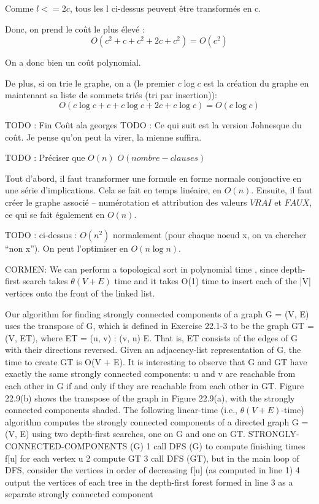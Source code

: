 \documentclass{article}
\begin{document}
Comme $l <= 2c$, tous les l ci-dessus peuvent être transformés en c.

Donc, on prend le coût le plus élevé :
$$
O(c^2 + c + c^2 + 2c + c^2) = O(c^2)
$$

On a donc bien un coût polynomial.

De plus, si on trie le graphe, on a (le premier $c \log c$ est la création du graphe en maintenant sa liste de sommets triés (tri par insertion)):
$$
O(c \log c + c + c \log c + 2c + c \log c) = O(c \log c)
$$

TODO : Fin Coût ala georges
TODO : Ce qui suit est la version Johnesque du coût. Je pense qu'on peut la virer, la mienne suffira.


TODO : Préciser que $O(n)$ $O(nombre-clauses)$

Tout d'abord, il faut transformer une formule en forme normale conjonctive en une série d'implications. Cela se fait en temps linéaire, en $O(n)$. Ensuite, il faut créer le graphe associé -- numérotation et attribution des valeurs $VRAI$ et $FAUX$, ce qui se fait également en $O(n)$.

TODO : ci-dessus : $O(n^2)$ normalement (pour chaque noeud x, on va chercher ``non x''). On peut l'optimiser en $O(n \log n)$.

CORMEN:
We can perform a topological sort in polynomial time , since depth-first search takes $\theta(V + E)$
time and it takes O(1) time to insert each of the |V| vertices onto the front of the linked list.


Our algorithm for finding strongly connected components of a graph G = (V, E) uses the
transpose of G, which is defined in Exercise 22.1-3 to be the graph GT = (V, ET), where ET =
{(u, v) : (v, u) E}. That is, ET consists of the edges of G with their directions reversed. Given
an adjacency-list representation of G, the time to create GT is O(V + E). It is interesting to
observe that G and GT have exactly the same strongly connected components: u and v are
reachable from each other in G if and only if they are reachable from each other in GT. Figure
22.9(b) shows the transpose of the graph in Figure 22.9(a), with the strongly connected
components shaded.
The following linear-time (i.e., $\theta(V + E)$-time) algorithm computes the strongly connected
components of a directed graph G = (V, E) using two depth-first searches, one on G and one
on GT.
STRONGLY-CONNECTED-COMPONENTS (G)
1 call DFS (G) to compute finishing times f[u] for each vertex u
2 compute GT
3 call DFS (GT), but in the main loop of DFS, consider the vertices
in order of decreasing f[u] (as computed in line 1)
4 output the vertices of each tree in the depth-first forest formed in
line 3 as a
separate strongly connected component
\end{document}

